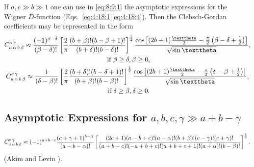 If $a, c \gg b \gg 1$ one can use in \eqref{eq:8:9:1} the asymptotic expressions for the Wigner $D$-function (Eqs.~\eqref{eq:4:18:1}\eqref{eq:4:18:4}). Then the Clebsch-Gordan coefficients may be represented in the form
\begin{gather}
\clebsch{a}{\alpha}{b}{\beta}{c}{\gamma} \approx \frac{(-1)^{\beta-\delta}}{(\beta-\delta)!}\left[\frac{2}{\pi} \frac{(b+\beta)!(b-\beta+1)!}{(b+\delta)!(b-\delta)!}\right]^{\frac{1}{2}} \frac{\cos \left[(2 b+1) \frac{\vartheta}{2}-\frac{\pi}{2}\left(\beta-\delta+\frac{1}{2}\right)\right]}{\sqrt{\sin \vartheta}}, \label{eq:8:9:9}\\
\text { if } \beta \geq \delta, \beta \geq 0, \notag\\
\clebsch{a}{\alpha}{b}{\beta}{c}{\gamma} \approx \frac{1}{(\delta-\beta)!}\left[\frac{2}{\pi} \frac{(b+\delta)!(b-\delta+1)!}{(b+\beta)!(b-\beta)!}\right]^{\frac{1}{2}} \frac{\cos \left[(2 b+1) \frac{\vartheta}{2}-\frac{\pi}{2}\left(\delta-\beta+\frac{1}{2}\right)\right]}{\sqrt{\sin \vartheta}}, \label{eq:8:9:10}\\
\text { if } \delta \geq \beta, \delta \geq 0 . \notag
\end{gather}
\subsection{Asymptotic Expressions for $a, b, c, \gamma \gg a+b-\gamma$}\label{sec:8.9.2}
\begin{equation}
C_{a\,\alpha\,b\,\beta}^{c\,\gamma} \approx(-1)^{a+b-c} \frac{(c+\gamma+1)^{b-\beta}}{(a-b-\alpha)!}\left[\frac{(2 c+1)(a-b+c)!(a-\alpha)!(b+\beta)!(c-\gamma)!(c+\gamma)!}{(a+b-c)!(-a+b+c)!(a+b+c+1)!(a+\alpha)!(b-\beta)!}\right]^{\frac{1}{2}}. \label{eq:8:9:11}
\end{equation}
(Akim and Levin \cite{ref046}).

